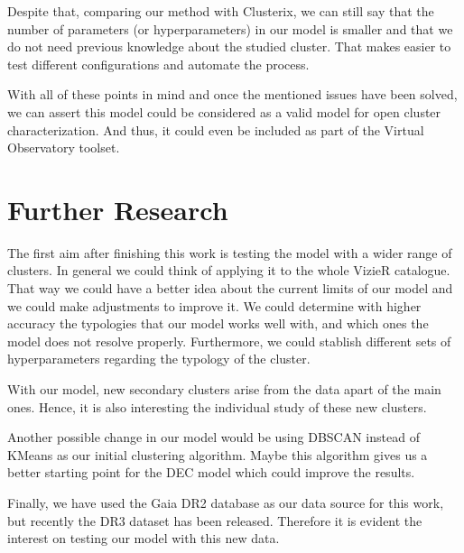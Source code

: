 \documentclass[11pt, a4paper, english]{book}
\begin{document}
Despite that, comparing our method with Clusterix,
we can still say that the number of parameters (or hyperparameters) in our model is smaller
and that we do not need previous knowledge about the studied cluster.
That makes easier to test different configurations and automate the process.

With all of these points in mind and once the mentioned issues have been solved,
we can assert this model could be considered as a valid model for open cluster characterization.
And thus, it could even be included as part of the Virtual Observatory toolset.

\section{Further Research}

The first aim after finishing this work is testing the model with a wider range of clusters.
In general we could think of applying it to the whole VizieR catalogue.
That way we could have a better idea about the current limits of our model and we could make adjustments to improve it.
We could determine with higher accuracy the typologies that our model works well with,
and which ones the model does not resolve properly.
Furthermore, we could stablish different sets of hyperparameters regarding the typology of the cluster.

With our model, new secondary clusters arise from the data apart of the main ones.
Hence, it is also interesting the individual study of these new clusters.

Another possible change in our model would be using DBSCAN instead of KMeans as our initial clustering algorithm.
Maybe this algorithm gives us a better starting point for the DEC model which could improve the results.

Finally, we have used the Gaia DR2 database as our data source for this work,
but recently the DR3 dataset has been released.
Therefore it is evident the interest on testing our model with this new data.

\newpage




\end{document}

